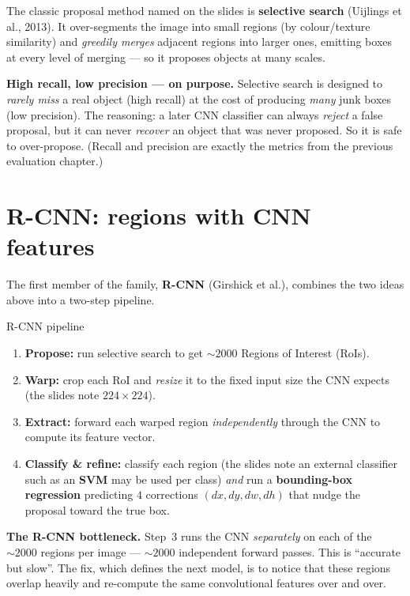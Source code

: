 \documentclass{report}
\begin{document}
The classic proposal method named on the slides is \textbf{selective search}
(Uijlings et al., 2013). It over-segments the image into small regions
(by colour/texture similarity) and \emph{greedily merges} adjacent regions into
larger ones, emitting boxes at every level of merging --- so it proposes objects
at many scales.

\begin{keybox}
\textbf{High recall, low precision --- on purpose.} Selective search is designed
to \emph{rarely miss} a real object (high recall) at the cost of producing
\emph{many} junk boxes (low precision). The reasoning: a later CNN classifier
can always \emph{reject} a false proposal, but it can never \emph{recover} an
object that was never proposed. So it is safe to over-propose. (Recall and
precision are exactly the metrics from the previous evaluation chapter.)
\end{keybox}

\section{R-CNN: regions with CNN features}

The first member of the family, \textbf{R-CNN} (Girshick et al.), combines the
two ideas above into a two-step pipeline.

\begin{defbox}{R-CNN pipeline}
\begin{enumerate}
\item \textbf{Propose:} run selective search to get $\sim\!2000$ Regions of
Interest (RoIs).
\item \textbf{Warp:} crop each RoI and \emph{resize} it to the fixed input
size the CNN expects (the slides note $224\times224$).
\item \textbf{Extract:} forward each warped region \emph{independently}
through the CNN to compute its feature vector.
\item \textbf{Classify \& refine:} classify each region (the slides note an
external classifier such as an \textbf{SVM} may be used per class) \emph{and}
run a \textbf{bounding-box regression} predicting $4$ corrections
$(dx,dy,dw,dh)$ that nudge the proposal toward the true box.
\end{enumerate}
\end{defbox}

\begin{keybox}
\textbf{The R-CNN bottleneck.} Step~3 runs the CNN \emph{separately} on each of
the $\sim\!2000$ regions per image --- $\sim\!2000$ independent forward passes.
This is ``accurate but slow''. The fix, which defines the next model, is to
notice that these regions overlap heavily and re-compute the same convolutional
features over and over.
\end{keybox}
\end{document}
